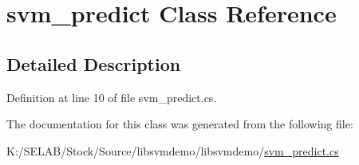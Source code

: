 \hypertarget{classsvm__predict}{
\section{svm\_\-predict Class Reference}
\label{classsvm__predict}
}


\subsection{Detailed Description}


Definition at line 10 of file svm\_\-predict.cs.



The documentation for this class was generated from the following file:\begin{DoxyCompactItemize}
\item 
K:/SELAB/Stock/Source/libsvmdemo/libsvmdemo/\hyperlink{svm__predict_8cs}{svm\_\-predict.cs}\end{DoxyCompactItemize}

